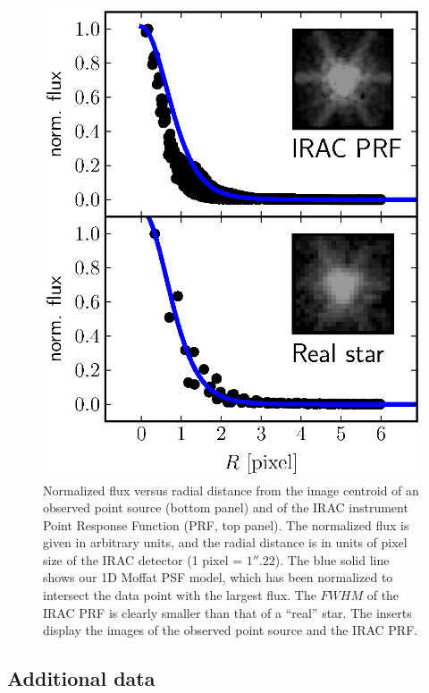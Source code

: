 \documentclass[preprint2]{emulateapj}
\begin{document}
\begin{figure}[h]
\begin{center}
\includegraphics[width=1\columnwidth, trim = 240 40 50 20, clip=True]{psf.eps}
\caption{Normalized flux versus radial distance 
from the image centroid of an observed point source (bottom panel) 
and of the IRAC instrument Point Response Function (PRF, top panel). 
The normalized flux is given in arbitrary units, 
and the radial distance is in units of pixel size of the IRAC detector (1 pixel = $1''.22$).
The blue solid line shows our 1D Moffat PSF model,
which has been normalized to intersect the data point with the largest flux. 
The $FWHM$ of the IRAC PRF is clearly smaller than that of a ``real'' star.
The inserts display the images of the observed point source and the IRAC PRF.}
\label{fig:psf}
\end{center}
\end{figure}



\subsection{Additional data}
\label{sec:adddata}
\end{document}
